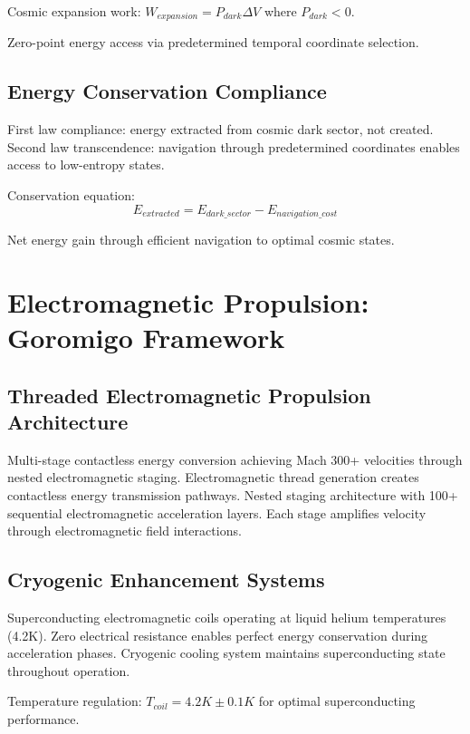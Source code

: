 \documentclass[12pt,a4paper]{article}
\begin{document}
Cosmic expansion work: $W_{expansion} = P_{dark} \Delta V$ where $P_{dark} < 0$.

Zero-point energy access via predetermined temporal coordinate selection.

\subsection{Energy Conservation Compliance}

First law compliance: energy extracted from cosmic dark sector, not created.
Second law transcendence: navigation through predetermined coordinates enables access to low-entropy states.

Conservation equation:
\begin{equation}
E_{extracted} = E_{dark\_sector} - E_{navigation\_cost}
\end{equation}

Net energy gain through efficient navigation to optimal cosmic states.

\section{Electromagnetic Propulsion: Goromigo Framework}

\subsection{Threaded Electromagnetic Propulsion Architecture}

Multi-stage contactless energy conversion achieving Mach 300+ velocities through nested electromagnetic staging. Electromagnetic thread generation creates contactless energy transmission pathways. Nested staging architecture with 100+ sequential electromagnetic acceleration layers. Each stage amplifies velocity through electromagnetic field interactions.

\subsection{Cryogenic Enhancement Systems}

Superconducting electromagnetic coils operating at liquid helium temperatures (4.2K). Zero electrical resistance enables perfect energy conservation during acceleration phases. Cryogenic cooling system maintains superconducting state throughout operation.

Temperature regulation: $T_{coil} = 4.2K \pm 0.1K$ for optimal superconducting performance.
\end{document}

